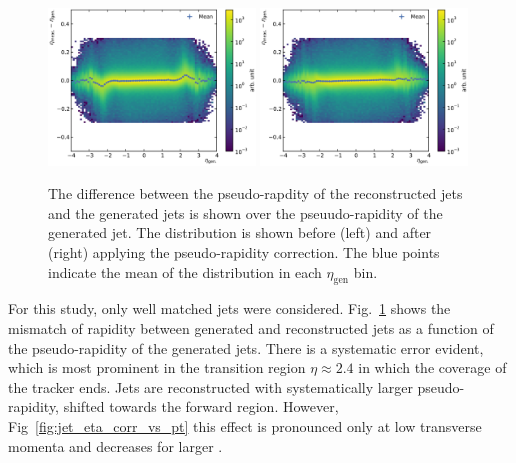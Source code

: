 \begin{figure}[htbp]
    \centering
    \includegraphics[width=0.49\textwidth]{figures/measurement/genvsreco_eta.pdf}\hfill
    \includegraphics[width=0.49\textwidth]{figures/measurement/genvsreco_eta_corr.pdf}
    \caption[Differences of pseudo-rapidity of reconstructed jets to
        generator-level jets]{The difference between the pseudo-rapdity of the
            reconstructed jets and the generated jets is shown over the
            pseuudo-rapidity of the generated jet. The distribution is shown
            before (left) and after (right) applying the pseudo-rapidity
            correction. The blue points indicate the mean of the distribution in
            each $\eta_{\mathrm{gen}}$ bin.}
    \label{fig:jet_eta_corr}
\end{figure}


For this study, only well matched jets were considered.
Fig.~\ref{fig:jet_eta_corr} shows the mismatch of rapidity between generated and
reconstructed jets as a function of the pseudo-rapidity of the generated jets.
There is a systematic error evident, which is most prominent in the transition
region $\eta \approx 2.4$ in which the coverage of the tracker ends. Jets are
reconstructed with systematically larger pseudo-rapidity, \ie shifted towards
the forward region. However, Fig~\ref{fig:jet_eta_corr_vs_pt} this effect is pronounced only at low transverse
momenta and decreases for larger \pt. 


